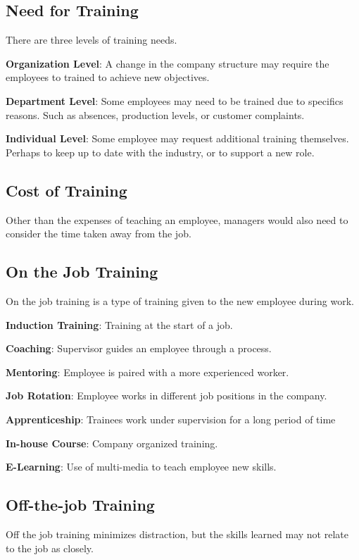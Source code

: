\documentclass{report}
\begin{document}
\subsection{Need for Training}
There are three levels of training needs.

\textbf{Organization Level}: A change in the company structure may require the employees to trained to achieve new objectives.

\textbf{Department Level}: Some employees may need to be trained due to specifics reasons. 
Such as absences, production levels, or customer complaints.

\textbf{Individual Level}: Some employee may request additional training themselves.
Perhaps to keep up to date with the industry, or to support a new role.

\subsection{Cost of Training}
Other than the expenses of teaching an employee, managers would also need to consider the time taken away from the job.

\subsection{On the Job Training}
On the job training is a type of training given to the new employee during work.

\textbf{Induction Training}: Training at the start of a job.

\textbf{Coaching}: Supervisor guides an employee through a process.

\textbf{Mentoring}: Employee is paired with a more experienced worker.

\textbf{Job Rotation}: Employee works in different job positions in the company.

\textbf{Apprenticeship}: Trainees work under supervision for a long period of time

\textbf{In-house Course}: Company organized training.

\textbf{E-Learning}: Use of multi-media to teach employee new skills.

\subsection{Off-the-job Training}
Off the job training minimizes distraction, but the skills learned may not relate to the job as closely.
\end{document}
